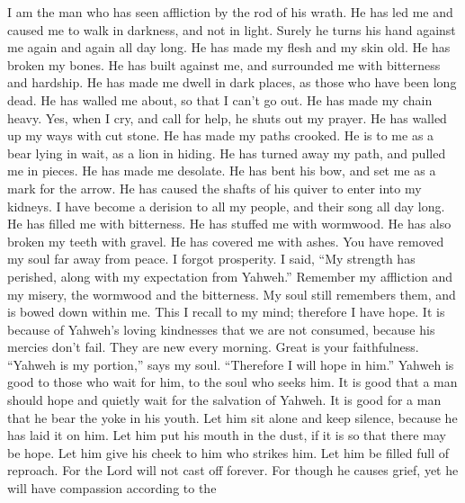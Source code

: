  I am the man who has seen affliction by the rod of his
wrath.  He has led me and caused me to walk in darkness, and
not in light.  Surely he turns his hand against me again and
again all day long.  He has made my flesh and my skin old.
He has broken my bones.  He has built against me, and
surrounded me with bitterness and hardship.  He has made me
dwell in dark places, as those who have been long dead.  He
has walled me about, so that I can't go out. He has made my chain heavy.
 Yes, when I cry, and call for help, he shuts out my prayer.
 He has walled up my ways with cut stone. He has made my
paths crooked.  He is to me as a bear lying in wait, as a
lion in hiding.  He has turned away my path, and pulled me
in pieces. He has made me desolate.  He has bent his bow,
and set me as a mark for the arrow.  He has caused the
shafts of his quiver to enter into my kidneys.  I have
become a derision to all my people, and their song all day long.
 He has filled me with bitterness. He has stuffed me with
wormwood.  He has also broken my teeth with gravel. He has
covered me with ashes.  You have removed my soul far away
from peace. I forgot prosperity.  I said, ``My strength has
perished, along with my expectation from Yahweh.'' 
Remember my affliction and my misery, the wormwood and the bitterness.
 My soul still remembers them, and is bowed down within me.
 This I recall to my mind; therefore I have hope.
 It is because of Yahweh's loving kindnesses that we are
not consumed, because his mercies don't fail.  They are new
every morning. Great is your faithfulness.  ``Yahweh is my
portion,'' says my soul. ``Therefore I will hope in him.'' 
Yahweh is good to those who wait for him, to the soul who seeks him.
 It is good that a man should hope and quietly wait for the
salvation of Yahweh.  It is good for a man that he bear the
yoke in his youth.  Let him sit alone and keep silence,
because he has laid it on him.  Let him put his mouth in
the dust, if it is so that there may be hope.  Let him give
his cheek to him who strikes him. Let him be filled full of reproach.
 For the Lord will not cast off forever.  For
though he causes grief, yet he will have compassion according to the
